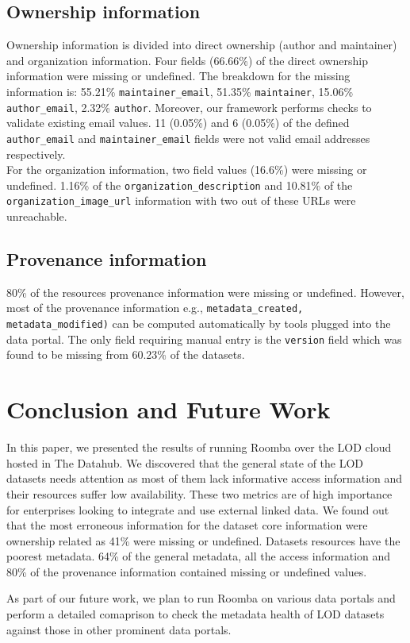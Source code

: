 \documentclass[runningheads,a4paper]{llncs}
\begin{document}
\subsection{Ownership information} Ownership information is divided into direct ownership (author and maintainer) and organization information. Four fields (66.66\%) of the direct ownership information were missing or undefined. The breakdown for the missing information is: 55.21\% \texttt{maintainer\_email}, 51.35\% \texttt{maintainer}, 15.06\% \texttt{author\_email}, 2.32\% \texttt{author}. Moreover, our framework performs checks to validate existing email values. 11 (0.05\%) and 6 (0.05\%) of the defined \texttt{author\_email} and \texttt{maintainer\_email} fields were not valid email addresses respectively.\\
For the organization information, two field values (16.6\%) were missing or undefined. 1.16\% of the \texttt{organization\_description} and 10.81\% of the \texttt{organization\-\_image\_url} information with two out of these URLs were unreachable.

\subsection{Provenance information} 80\% of the resources provenance information were missing or undefined. However, most of the provenance information e.g., \texttt{metadata\_created, \\metadata\_modified)} can be computed automatically by tools plugged into the data portal. The only field requiring manual entry is the \texttt{version} field which was found to be missing from 60.23\% of the datasets.

\section{Conclusion and Future Work}
\label{sec:conclusion}

In this paper, we presented the results of running Roomba over the LOD cloud hosted in The Datahub. We discovered that the general state of the LOD datasets needs attention as most of them lack informative access information and their resources suffer low availability. These two metrics are of high importance for enterprises looking to integrate and use external linked data. We found out that the most erroneous information for the dataset core information were ownership related as 41\% were missing or undefined. Datasets resources have the poorest metadata. 64\% of the general metadata, all the access information and 80\% of the provenance information contained missing or undefined values.

As part of our future work, we plan to run Roomba on various data portals and perform a detailed comaprison to check the metadata health of LOD datasets against those in other prominent data portals.



\nocite{*}

\end{document}
